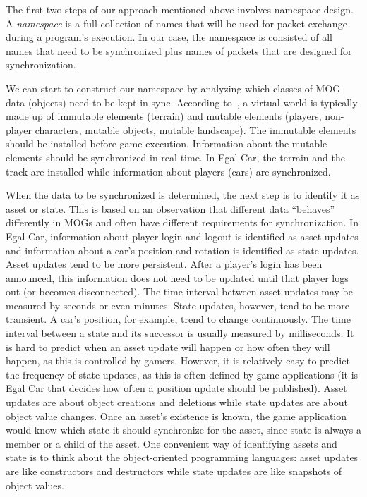 \documentclass{article}
\begin{document}
The first two steps of our approach mentioned above involves namespace design. A \emph{namespace} is a full collection of names that will be used for packet exchange during a program's execution. In our case, the namespace is consisted of all names that need to be synchronized plus names of packets that are designed for synchronization. 

We can start to construct our namespace by analyzing which classes of MOG data (objects) need to be kept in sync. According to~\cite{Upen}, a virtual world is typically made up of immutable elements (terrain) and mutable elements (players, non-player characters, mutable objects, mutable landscape). The immutable elements should be installed before game execution. Information about the mutable elements should be synchronized in real time. In Egal Car, the terrain and the track are installed while information about players (cars) are synchronized.

When the data to be synchronized is determined, the next step is to identify it as asset or state. This is based on an observation that different data ``behaves'' differently in MOGs and often have different requirements for synchronization. In Egal Car, information about player login and logout is identified as asset updates and information about a car's position and rotation is identified as state updates. Asset updates tend to be more persistent. After a player's login has been announced, this information does not need to be updated until that player logs out (or becomes disconnected). The time interval between asset updates may be measured by seconds or even minutes. State updates, however, tend to be more transient. A car's position, for example, trend to change continuously. The time interval between a state and its successor is usually measured by milliseconds. It is hard to predict when an asset update will happen or how often they will happen, as this is controlled by gamers. However, it is relatively easy to predict the frequency of state updates, as this is often defined by game applications (it is Egal Car that decides how often a position update should be published). Asset updates are about object creations and deletions while state updates are about object value changes. Once an asset's existence is known, the game application would know which state it should synchronize for the asset, since state is always a member or a child of the asset. One convenient way of identifying assets and state is to think about the object-oriented programming languages: asset updates are like constructors and destructors while state updates are like snapshots of object values.
\end{document}

